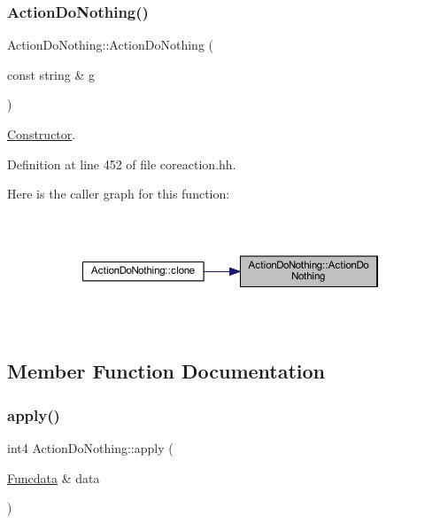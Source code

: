 \subsubsection{\texorpdfstring{ActionDoNothing()}{ActionDoNothing()}}
{\footnotesize\ttfamily Action\+Do\+Nothing\+::\+Action\+Do\+Nothing (\begin{DoxyParamCaption}\item[{const string \&}]{g }\end{DoxyParamCaption})\hspace{0.3cm}{\ttfamily [inline]}}



\mbox{\hyperlink{class_constructor}{Constructor}}. 



Definition at line 452 of file coreaction.\+hh.

Here is the caller graph for this function\+:
\nopagebreak
\begin{figure}[H]
\begin{center}
\leavevmode
\includegraphics[width=350pt]{class_action_do_nothing_a1f866188d3a74f84764b048fae827a48_icgraph}
\end{center}
\end{figure}


\subsection{Member Function Documentation}
\mbox{\label{class_action_do_nothing_a731f2fd0ba173c40a794de849bfabe4b}} 
\subsubsection{\texorpdfstring{apply()}{apply()}}
{\footnotesize\ttfamily int4 Action\+Do\+Nothing\+::apply (\begin{DoxyParamCaption}\item[{\mbox{\hyperlink{class_funcdata}{Funcdata}} \&}]{data }\end{DoxyParamCaption})\hspace{0.3cm}{\ttfamily [virtual]}}



